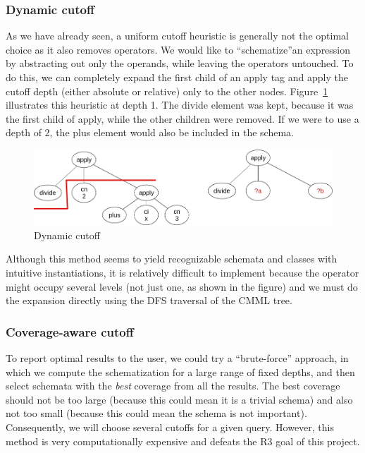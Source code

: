 \documentclass[a4paper,oneside]{article}
\begin{document}
\subsubsection{Dynamic cutoff}\label{subsubsec:dynamic_cutoff}
As we have already seen, a uniform cutoff heuristic is generally not the
optimal choice as it also removes operators. We would like to ``schematize''an
expression by abstracting out only the operands, while leaving the operators
untouched. To do this, we can completely expand the first child of an
\textsf{apply} tag and apply the cutoff depth (either absolute or relative)
only to the other nodes. Figure~\ref{fig:cutoff_dynamic} illustrates this
heuristic at depth 1. The \textsf{divide} element was kept, because it was the
first child of \textsf{apply}, while the other children were removed.
If we were to use a depth of 2, the \textsf{plus} element would also be
included in the schema.

\begin{figure}[ht]\centering
    \includegraphics[scale=0.3]{img/cutoff_dynamic.png}
    \caption{Dynamic cutoff}\label{fig:cutoff_dynamic}
\end{figure}
\FloatBarrier

Although this method seems to yield recognizable schemata and classes with
intuitive instantiations, it is relatively difficult to implement because the
operator might occupy several levels (not just one, as shown in the figure) and
we must do the expansion directly using the DFS traversal of the CMML tree.

\subsubsection{Coverage-aware cutoff}\label{subsubsec:coverage_aware_cutoff}
To report optimal results to the user, we could try a ``brute-force'' approach,
in which we compute the schematization for a large range of fixed depths, and
then select schemata with the \textit{best} coverage from all the results. The
best coverage should not be too large (because this could mean it is a trivial
schema) and also not too small (because this could mean the schema is not
important). Consequently, we will choose several cutoffs for a given query.
However, this method is very computationally expensive and defeats
the \textsf{R3} goal of this project.
\end{document}
